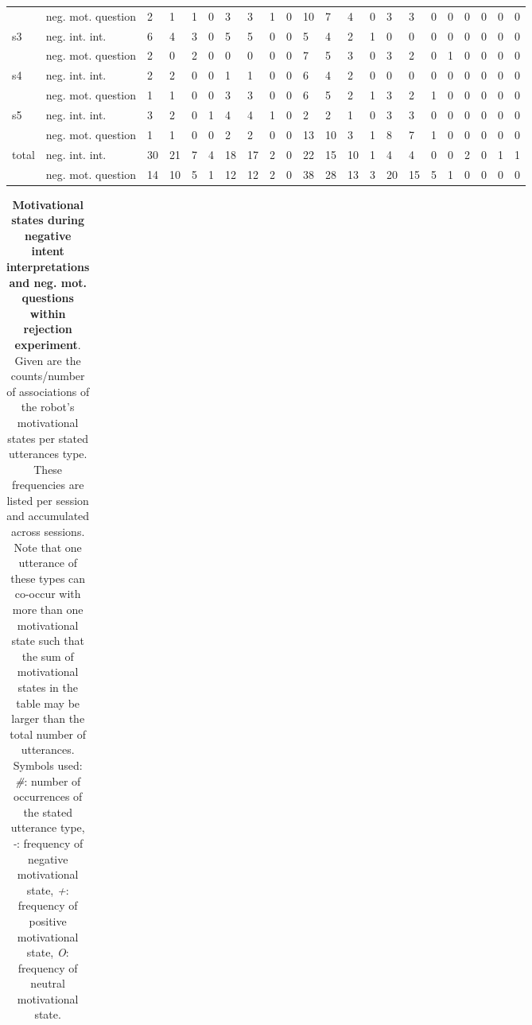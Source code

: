 \begin{screenonly}
\begin{table*}[h]
\begin{small}
\begin{tabular*}{\hsize}{@{\extracolsep{\fill}}llllllllllllllllllllll}
      & neg. mot. question & 2 & 1 & 1 & 0 & 3 & 3 & 1 & 0 & 10 & 7 & 4 & 0 & 3 & 3 & 0 & 0 & 0 & 0 & 0 & 0\\
      \multirow{2}{*}{s3} & neg. int. int. & 6 & 4 & 3 & 0 & 5 & 5 & 0 & 0 & 5 & 4 & 2 & 1 & 0 & 0 & 0 & 0 & 0 & 0 & 0 & 0\\
      & neg. mot. question & 2 & 0 & 2 & 0 & 0 & 0 & 0 & 0 & 7 & 5 & 3 & 0 & 3 & 2 & 0 & 1 & 0 & 0 & 0 & 0\\
      \multirow{2}{*}{s4} & neg. int. int. & 2 & 2 & 0 & 0 & 1 & 1 & 0 & 0 & 6 & 4 & 2 & 0 & 0 & 0 & 0 & 0 & 0 & 0 & 0 & 0\\
      & neg. mot. question & 1 & 1 & 0 & 0 & 3 & 3 & 0 & 0 & 6 & 5 & 2 & 1 & 3 & 2 & 1 & 0 & 0 & 0 & 0 & 0\\
      \multirow{2}{*}{s5} & neg. int. int. & 3 & 2 & 0 & 1 & 4 & 4 & 1 & 0 & 2 & 2 & 1 & 0 & 3 & 3 & 0 & 0 & 0 & 0 & 0 & 0\\
      & neg. mot. question & 1 & 1 & 0 & 0 & 2 & 2 & 0 & 0 & 13 & 10 & 3 & 1 & 8 & 7 & 1 & 0 & 0 & 0 & 0 & 0\\
      \multirow{2}{*}{total} & neg. int. int. & 30 & 21 & 7 & 4 & 18 & 17 & 2 & 0 & 22 & 15 & 10 & 1 & 4 & 4 & 0 & 0 & 2 & 0 & 1 & 1\\
      & neg. mot. question & 14 & 10 & 5 & 1 & 12 & 12 & 2 & 0 & 38 & 28 & 13 & 3 & 20 & 15 & 5 & 1 & 0 & 0 & 0 & 0\\
      \bottomrule
    \end{tabular*}
  \end{small}
\end{table*}
\begin{table*}[h]
  \setlength{\tabcolsep}{0.93ex}
  \caption{\textbf{Motivational states during negative intent interpretations and neg. mot. questions within rejection experiment}. 
    Given are the counts/number of associations of the robot's motivational states per stated utterances type. These frequencies are
    listed per session and accumulated across sessions. Note that one utterance of these types can co-occur with more than one motivational state such that
    the sum of motivational states in the table  may be larger than the total number of utterances. Symbols used: \emph{\#}: number of occurrences of the
    stated utterance type, \emph{-}: frequency of negative motivational state, \emph{+}: frequency of positive motivational state, \emph{O}: frequency of
    neutral motivational state.}
  \label{tbl:neg_int_int_mot1}
  \begin{small}
    \begin{tabular*}{\hsize}{@{\extracolsep{\fill}}llllllllllllllllllllll}

\end{tabular*}
\end{small}
\end{table*}
\end{screenonly}
